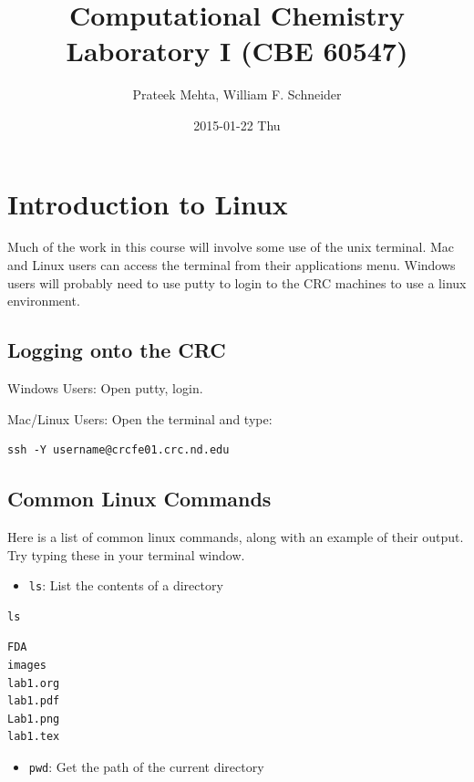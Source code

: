 \documentclass[11pt]{article}
\author{Prateek Mehta, William F. Schneider}
\date{2015-01-22 Thu}
\title{Computational Chemistry Laboratory I (CBE 60547)}
\begin{document}
\maketitle

\section{Introduction to Linux}
\label{sec-1}

Much of the work in this course will involve some use of the unix terminal. Mac and Linux users can access the terminal from their applications menu. Windows users will probably need to use putty to login to the CRC machines to use a linux environment.

\subsection{Logging onto the CRC}
\label{sec-1-1}

Windows Users: Open putty, login. 

Mac/Linux Users: Open the terminal and type: 

\begin{verbatim}
ssh -Y username@crcfe01.crc.nd.edu
\end{verbatim}


\subsection{Common Linux Commands}
\label{sec-1-2}

Here is a list of common linux commands, along with an example of their output. Try typing these in your terminal window.

\begin{itemize}
\item \verb~ls~: List the contents of a directory
\end{itemize}

\begin{verbatim}
ls
\end{verbatim}

\begin{verbatim}
FDA
images
lab1.org
lab1.pdf
Lab1.png
lab1.tex
\end{verbatim}

\begin{itemize}
\item \verb~pwd~: Get the path of the current directory
\end{itemize}
\end{document}
